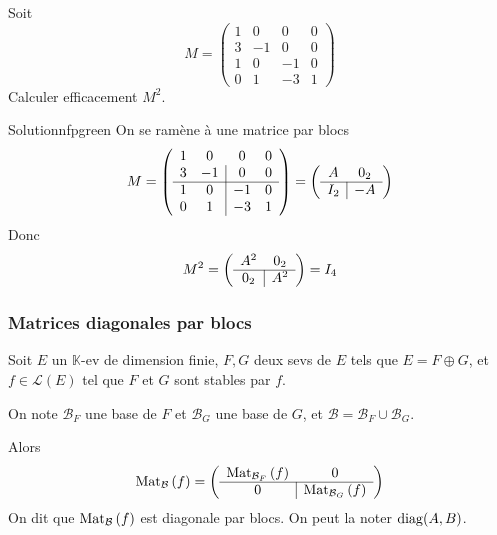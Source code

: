     \begin{exo}{}{}
        Soit 
        \[ M = \begin{pmatrix}
            1 & 0 & 0 & 0 \\
            3 & -1 & 0 & 0 \\
            1 & 0 & -1 & 0 \\
            0 & 1 & -3 & 1 
        \end{pmatrix} \]    
        Calculer efficacement $M^2$.
    \end{exo}

    \begin{demo}{Solution}{nfpgreen}
        On se ramène à une matrice par blocs 
        \[ M = \left( \begin{array}{cc | cc}
            1 & 0 & 0 & 0 \\
            3 & -1 & 0 & 0 \\
            \hline
            1 & 0 & -1 & 0 \\
            0 & 1 & -3 & 1 
        \end{array} \right) =  \left( \begin{array}{c | c}
            A & 0_2 \\
            \hline 
            I_2 & -A 
        \end{array} \right) \]
        Donc 
        \[ M^2 = \left( \begin{array}{c | c}
            A^2 & 0_2 \\
            \hline 
            0_2 & A^2 
        \end{array} \right) = I_4 \]
    \end{demo}

    \subsubsection{Matrices diagonales par blocs}

    \begin{prop}{}{}
        Soit $E$ un $\mathbb{K}$-ev de dimension finie, $F,G$ deux sevs de $E$ tels que $E = F \oplus G$, et $f \in \mathcal{L}(E)$ tel que $F$ et $G$ sont stables par $f$. 

        On note $\mathcal{B}_F$ une base de $F$ et $\mathcal{B}_G$ une base de $G$, et $\mathcal{B} = \mathcal{B}_F \cup \mathcal{B}_G$.

        Alors 
        \[ \text{Mat}_{\mathcal{B}}\left(f\right) = 
        \left( \begin{array}{c | c}
            \text{Mat}_{\mathcal{B}_F}\left(f\right) & 0 \\
            \hline 
            0 & \text{Mat}_{\mathcal{B}_G}\left(f\right)
        \end{array} \right) \]
        On dit que $\text{Mat}_{\mathcal{B}}\left(f\right)$ est diagonale par blocs. On peut la noter $\operatorname{diag}(A,B)$.
    \end{prop}

